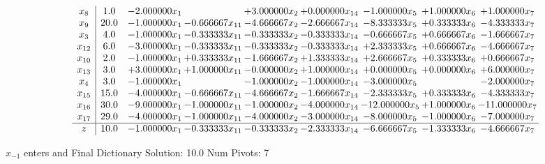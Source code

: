 \documentclass[10pt]{article}
\begin{document}
 \[\begin{array}{c| c c@{\hskip 2pt} c@{\hskip 2pt} c@{\hskip 2pt} c@{\hskip 2pt} c@{\hskip 2pt} c@{\hskip 2pt} c@{\hskip 2pt} }
 x_{8}   &  1.0 & -2.000000 x_{1} &   & + 3.000000 x_{2} & + 0.000000 x_{14} & -1.000000 x_{5} & + 1.000000 x_{6} & + 1.000000 x_{7}\\
 x_{9}   &  20.0 & -1.000000 x_{1} & -0.666667 x_{11} & -4.666667 x_{2} & -2.666667 x_{14} & -8.333333 x_{5} & + 0.333333 x_{6} & -4.333333 x_{7}\\
 x_{3}   &  4.0 & -1.000000 x_{1} & -0.333333 x_{11} & -0.333333 x_{2} & -0.333333 x_{14} & -0.666667 x_{5} & + 0.666667 x_{6} & -1.666667 x_{7}\\
 x_{12}   &  6.0 & -3.000000 x_{1} & -0.333333 x_{11} & -0.333333 x_{2} & -0.333333 x_{14} & + 2.333333 x_{5} & + 0.666667 x_{6} & -4.666667 x_{7}\\
 x_{10}   &  2.0 & -1.000000 x_{1} & + 0.333333 x_{11} & -1.666667 x_{2} & + 1.333333 x_{14} & + 2.666667 x_{5} & + 0.333333 x_{6} & + 0.666667 x_{7}\\
 x_{13}   &  3.0 & + 3.000000 x_{1} & + 1.000000 x_{11} & -0.000000 x_{2} & + 1.000000 x_{14} & + 0.000000 x_{5} & + 0.000000 x_{6} & + 6.000000 x_{7}\\
 x_{4}   &  3.0 & -1.000000 x_{1} &   & -1.000000 x_{2} & -1.000000 x_{14} & -3.000000 x_{5} &   & -2.000000 x_{7}\\
 x_{15}   &  15.0 & -4.000000 x_{1} & -0.666667 x_{11} & -4.666667 x_{2} & -1.666667 x_{14} & -2.333333 x_{5} & + 0.333333 x_{6} & -4.333333 x_{7}\\
 x_{16}   &  30.0 & -9.000000 x_{1} & -1.000000 x_{11} & -1.000000 x_{2} & -4.000000 x_{14} & -12.000000 x_{5} & + 1.000000 x_{6} & -11.000000 x_{7}\\
 x_{17}   &  29.0 & -4.000000 x_{1} & -1.000000 x_{11} & -4.000000 x_{2} & -3.000000 x_{14} & -8.000000 x_{5} & -1.000000 x_{6} & -7.000000 x_{7}\\
\hline
z    &  10.0 & -1.000000 x_{1} & -0.333333 x_{11} & -0.333333 x_{2} & -2.333333 x_{14} & -6.666667 x_{5} & -1.333333 x_{6} & -4.666667 x_{7}\\
\end{array}\]


 $ x_{-1} $ enters and Final Dictionary
Solution:  10.0
Num Pivots:  7
\end{document}
